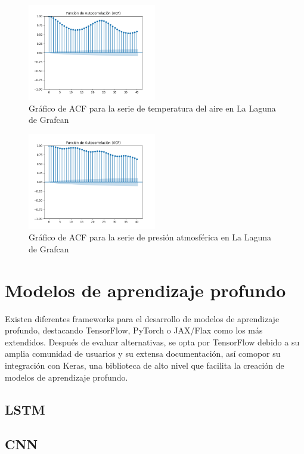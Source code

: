 \begin{figure}[H]
    \centering
    \includegraphics[width=0.5\textwidth]{images/arima_acf_temp.png}
    \caption{Gráfico de ACF para la serie de temperatura del aire en La Laguna de Grafcan}
    \label{acf_arima_temp}
\end{figure}

\begin{figure}[H]
    \centering
    \includegraphics[width=0.5\textwidth]{images/arima_acf_pres.png}
    \caption{Gráfico de ACF para la serie de presión atmosférica en La Laguna de Grafcan}
    \label{acf_arima_pres}
\end{figure}

\section{Modelos de aprendizaje profundo}
Existen diferentes frameworks para el desarrollo de modelos de aprendizaje profundo, destacando TensorFlow, PyTorch o JAX/Flax como los más extendidos.
Después de evaluar alternativas, se opta por TensorFlow debido a su amplia comunidad de usuarios y su extensa documentación, así comopor su integración con Keras, 
una biblioteca de alto nivel que facilita la creación de modelos de aprendizaje profundo.

\subsection{LSTM}

\subsection{CNN}

